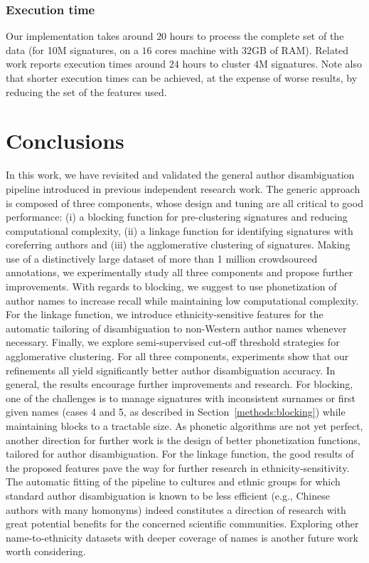 \documentclass[runningheads,a4paper]{llncs}
\makeatletter
\newcommand*{\eg}{e.g.\@\xspace}
\newcommand{\longpage}{\enlargethispage{1.5\baselineskip}}
\makeatother
\begin{document}
\subsubsection{Execution time} Our implementation takes around $20$ hours to process the complete set of the data (for 10M signatures, on a $16$ cores machine with $32$GB of RAM). Related work \cite{khabsa2014large} reports execution times around $24$ hours to cluster $4$M signatures. Note also that shorter execution times can be achieved, at the expense of worse results, by reducing the set of the features used.



\section{Conclusions}
\label{conclusions}

\longpage

In this work, we have revisited and validated the general author disambiguation
pipeline introduced in previous independent research work.
The generic approach is composed of three components, whose design and tuning are all critical
to good performance: (i) a blocking function for pre-clustering signatures
and reducing computational complexity, (ii) a linkage function for identifying
signatures with coreferring authors and (iii) the agglomerative clustering of
signatures. Making use of a distinctively large dataset of more than 1 million
crowdsourced annotations, we experimentally study all three components and
propose further improvements. With regards to blocking, we suggest to use
phonetization of author names to increase recall while maintaining low
computational complexity. For the linkage function, we introduce
ethnicity-sensitive features for the automatic tailoring of disambiguation to non-Western
author names whenever necessary. Finally, we explore semi-supervised cut-off
threshold strategies for agglomerative clustering. For all three components,
experiments show that our refinements all yield significantly better author
disambiguation accuracy.
In general, the results encourage further improvements and research. For blocking, one of the
challenges is to manage signatures with inconsistent surnames or first given names (cases 4
and 5, as described in Section~\ref{methods:blocking}) while maintaining blocks to a tractable
size. As phonetic algorithms are not yet perfect, another direction  for further work is the
design of better phonetization functions, tailored for author disambiguation. For the linkage
function, the good results of the proposed features pave the way for further research in
ethnicity-sensitivity. The automatic fitting of the
pipeline to cultures and ethnic groups for which standard author disambiguation
is known to be less efficient (\eg, Chinese authors with many homonyms) indeed
constitutes a direction of research with great potential benefits for the
concerned scientific communities. Exploring other name-to-ethnicity datasets with deeper 
coverage of names is another future work worth considering.
\end{document}
